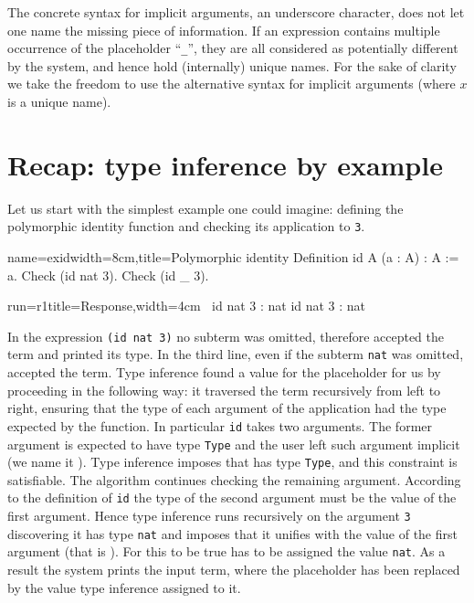 The concrete syntax for implicit arguments, an underscore character,
does not let one name the missing piece of information.
If an expression contains multiple occurrence
of the placeholder ``\lstinline/_/'', they are all considered as
potentially different by the system, and hence hold (internally)
unique names.  For the sake of clarity we take the freedom to
use the alternative syntax  for implicit arguments (where
$x$ is a unique name).

\section{Recap: type inference by example}

Let us start with the simplest example one could imagine: defining the
polymorphic identity function and checking its application to
\lstinline/3/.

\begin{coq-left}{name=exid}{width=8cm,title=Polymorphic identity}
Definition id A (a : A) : A := a.
Check (id nat 3).
Check (id _ 3).
\end{coq-left}
\begin{coqout-right}{run=r1}{title=Response,width=4cm}
$~$
id nat 3 : nat
id nat 3 : nat
\end{coqout-right}

In the expression \lstinline/(id nat 3)/ no subterm was omitted,
therefore \Coq{} accepted the term and printed its type.  In the third
line, even if the subterm \lstinline/nat/ was omitted, \Coq{} accepted
the term.  Type inference found a value for the placeholder
for us by proceeding in the following way:  it traversed the term
recursively from left to right, ensuring that the type of each
argument of the application had the type expected by the function.  In
particular \lstinline/id/ takes two arguments.
The former argument is expected to have type \lstinline/Type/ and the
user left such argument implicit (we name it ).   Type
inference imposes that  has type \lstinline/Type/, and this
constraint is satisfiable.  The algorithm continues checking the
remaining argument.  According to the definition of \lstinline/id/ the type of
the second argument must be the value of the first argument.  Hence
type inference runs recursively on the argument \lstinline/3/
discovering it has type \lstinline/nat/ and imposes that it unifies
with the value of the first argument (that is ).  For this
to be true  has to be assigned the value \lstinline/nat/.
As a result the system prints the input term, where the placeholder
has been replaced by the value type inference assigned to it.

